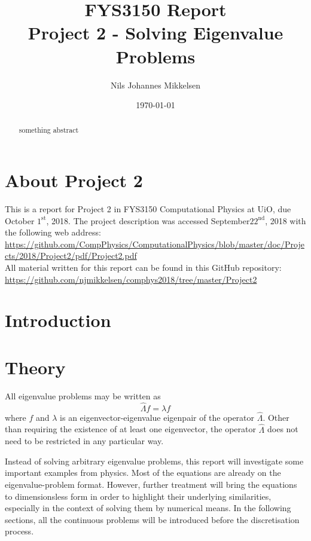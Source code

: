 \documentclass[reprint,english]{revtex4-1}
\begin{document}
\title{FYS3150 Report\\Project 2 - Solving Eigenvalue Problems}
\author{Nils Johannes Mikkelsen}
\date{\today}
\noaffiliation
\begin{abstract}
something abstract
\end{abstract}
\maketitle

\section*{About Project 2}
This is a report for Project 2 in FYS3150 Computational Physics at UiO, due October \(1^{\text{st}}\), 2018. \cite{project2} The project description was accessed September\(22^{\text{nd}}\), 2018 with the following web address:\\
{\scriptsize\url{https://github.com/CompPhysics/ComputationalPhysics/blob/master/doc/Projects/2018/Project2/pdf/Project2.pdf}}\\
All material written for this report can be found in this GitHub repository:\\
{\scriptsize\url{https://github.com/njmikkelsen/comphys2018/tree/master/Project2}}
\section{Introduction}

\section{Theory}
All eigenvalue problems may be written as
\begin{equation}
\hat{\Lambda}f=\lambda f
\end{equation}
where \(f\) and \(\lambda\) is an eigenvector-eigenvalue eigenpair of the operator \(\hat{\Lambda}\). Other than requiring the existence of at least one eigenvector, the operator \(\hat{\Lambda}\) does not need to be restricted in any particular way.

Instead of solving arbitrary eigenvalue problems, this report will investigate some important examples from physics. Most of the equations are already on the eigenvalue-problem format. However, further treatment will bring the equations to dimensionsless form in order to highlight their underlying similarities, especially in the context of solving them by numerical means. In the following sections, all the continuous problems will be introduced before the discretisation process.
\end{document}
